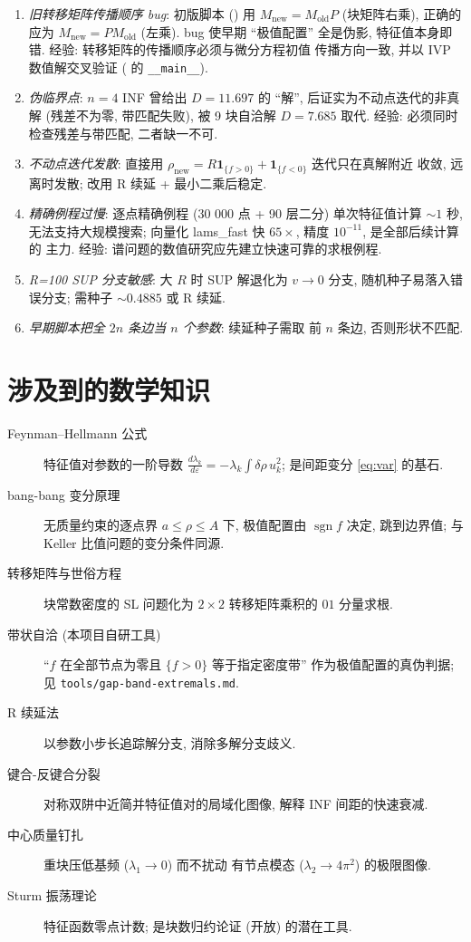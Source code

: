 \documentclass[UTF8]{ctexart}
\begin{document}
\begin{enumerate}
	\item \emph{旧转移矩阵传播顺序 bug}: 初版脚本
		() 用 $M_{\mathrm{new}} =
		M_{\mathrm{old}} P$ (块矩阵右乘), 正确的应为 $M_{\mathrm{new}} =
		P M_{\mathrm{old}}$ (左乘). bug 使早期 ``极值配置'' 全是伪影,
		特征值本身即错. 经验: 转移矩阵的传播顺序必须与微分方程初值
		传播方向一致, 并以 IVP 数值解交叉验证
		( 的 \texttt{\_\_main\_\_}).
	\item \emph{伪临界点}: $n=4$ INF 曾给出 $D = 11.697$ 的 ``解'',
		后证实为不动点迭代的非真解 (残差不为零, 带匹配失败), 被
		9 块自洽解 $D = 7.685$ 取代. 经验: 必须同时检查残差与带匹配,
		二者缺一不可.
	\item \emph{不动点迭代发散}: 直接用 $\rho_{\mathrm{new}} = R
		\mathbf{1}_{\{f>0\}} + \mathbf{1}_{\{f<0\}}$ 迭代只在真解附近
		收敛, 远离时发散; 改用 R 续延 + 最小二乘后稳定.
	\item \emph{精确例程过慢}: 逐点精确例程 (30 000 点 + 90 层二分)
		单次特征值计算 $\sim 1$ 秒, 无法支持大规模搜索; 向量化
		lams\_fast 快 $65\times$, 精度 $10^{-11}$, 是全部后续计算的
		主力. 经验: 谱问题的数值研究应先建立快速可靠的求根例程.
	\item \emph{R=100 SUP 分支敏感}: 大 $R$ 时 SUP 解退化为 $v \to 0$
		分支, 随机种子易落入错误分支; 需种子 $\sim 0.4885$ 或 R 续延.
	\item \emph{早期脚本把全 $2n$ 条边当 $n$ 个参数}: 续延种子需取
		前 $n$ 条边, 否则形状不匹配.
\end{enumerate}

\section{涉及到的数学知识}

\begin{description}
	\item[Feynman--Hellmann 公式] 特征值对参数的一阶导数
		$\frac{d\lambda_k}{d\varepsilon} = -\lambda_k\int\delta\rho\,u_k^2$;
		是间距变分 \eqref{eq:var} 的基石.
	\item[bang-bang 变分原理] 无质量约束的逐点界 $a \leq \rho \leq A$
		下, 极值配置由 $\operatorname{sgn} f$ 决定, 跳到边界值;
		与 Keller 比值问题的变分条件同源.
	\item[转移矩阵与世俗方程] 块常数密度的 SL 问题化为 $2\times2$
		转移矩阵乘积的 $01$ 分量求根.
	\item[带状自洽 (本项目自研工具)] ``$f$ 在全部节点为零且
		$\{f>0\}$ 等于指定密度带'' 作为极值配置的真伪判据; 见
		\texttt{tools/gap-band-extremals.md}.
	\item[R 续延法] 以参数小步长追踪解分支, 消除多解分支歧义.
	\item[键合-反键合分裂] 对称双阱中近简并特征值对的局域化图像,
		解释 INF 间距的快速衰减.
	\item[中心质量钉扎] 重块压低基频 ($\lambda_1 \to 0$) 而不扰动
		有节点模态 ($\lambda_2 \to 4\pi^2$) 的极限图像.
	\item[Sturm 振荡理论] 特征函数零点计数; 是块数归约论证 (开放)
		的潜在工具.
\end{description}
\end{document}
